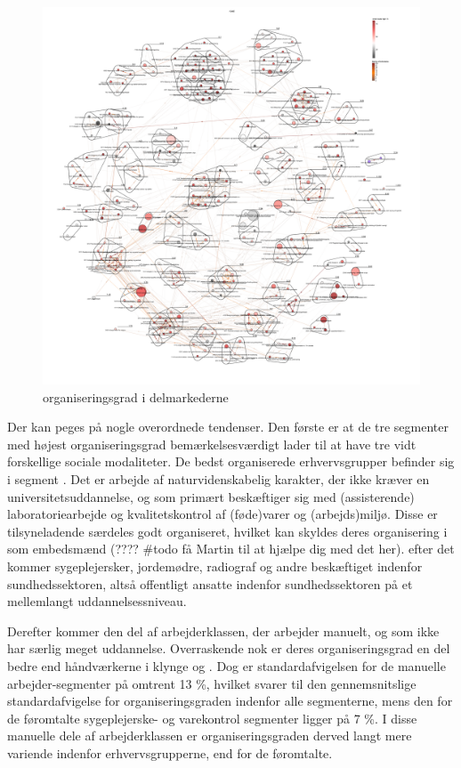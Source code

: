 %
\begin{figure}[H]
\begin{center}
  \caption{organiseringsgrad i delmarkederne}
  \label{fig_delanalyse2_kort_roed}
  \includegraphics[width=1.0\textwidth]{fig/netvaerkskort/kort_roed.pdf}
\end{center}
\end{figure}
\restoregeometry
%

Der kan peges på nogle overordnede tendenser. Den første er at de tre segmenter med højest organiseringsgrad bemærkelsesværdigt lader til at have tre vidt forskellige sociale modaliteter. De bedst organiserede  erhvervsgrupper befinder sig i segment . Det er arbejde af naturvidenskabelig karakter, der ikke kræver en universitetsuddannelse, og som primært beskæftiger sig med (assisterende) laboratoriearbejde og kvalitetskontrol af (føde)varer og (arbejds)miljø. Disse er tilsyneladende særdeles godt organiseret, hvilket kan skyldes deres organisering i som embedsmænd (???? \#todo få Martin til at hjælpe dig med det her). efter det kommer sygeplejersker, jordemødre, radiograf og andre beskæftiget indenfor sundhedssektoren, altså offentligt ansatte indenfor sundhedssektoren på et mellemlangt uddannelsessniveau. 

Derefter kommer den del af arbejderklassen, der arbejder manuelt, og som ikke har særlig meget uddannelse. Overraskende nok er deres organiseringsgrad en del bedre end håndværkerne i klynge  og . Dog er standardafvigelsen for de manuelle arbejder-segmenter på omtrent 13 \%, hvilket svarer til den gennemsnitslige standardafvigelse for organiseringsgraden indenfor alle segmenterne, mens den for de føromtalte sygeplejerske- og varekontrol segmenter ligger på 7 \%. I disse manuelle dele af arbejderklassen er organiseringsgraden derved langt mere variende indenfor erhvervsgrupperne, end for de føromtalte. 

